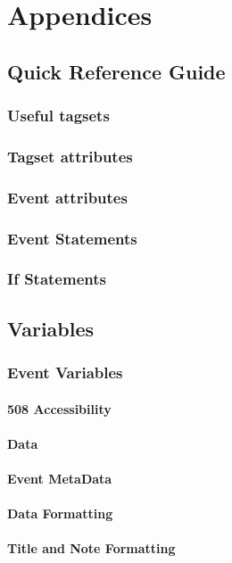 \documentclass{book}
\begin{document}
\part{Appendices}
\appendix
\begin{appendix}
\chapter{Quick Reference Guide}
\section{Useful tagsets}
\section{Tagset attributes}
\section{Event attributes}
\section{Event Statements}
\section{If Statements}
\chapter{Variables}
\section{Event Variables}
\subsection{508 Accessibility}
\subsection{Data}
\subsection{Event MetaData}
\subsection{Data Formatting}
\subsection{Title and Note Formatting}

\end{appendix}
\end{document}
